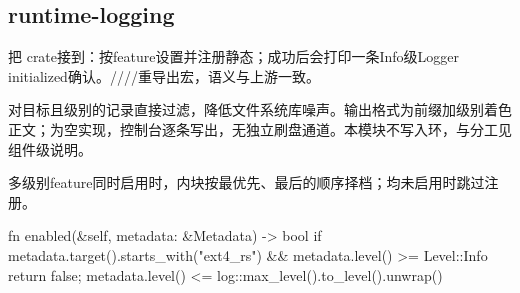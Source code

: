 
\subsection{runtime-logging}

把 crate接到：按feature设置并注册静态；成功后会打印一条Info级Logger initialized确认。////重导出宏，语义与上游一致。

对目标且级别的记录直接过滤，降低文件系统库噪声。输出格式为\code{[WaterOS]}前缀加级别着色正文；为空实现，控制台逐条写出，无独立刷盘通道。本模块不写入环，与分工见组件级说明。

多级别feature同时启用时，内块按最优先、最后的顺序择档；均未启用时跳过注册。

\begin{rustcode}
fn enabled(&self, metadata: &Metadata) -> bool {
    if metadata.target().starts_with("ext4_rs")
        && metadata.level() >= Level::Info
    {
        return false;
    }
    metadata.level() <= log::max_level().to_level().unwrap()
}
\end{rustcode}
